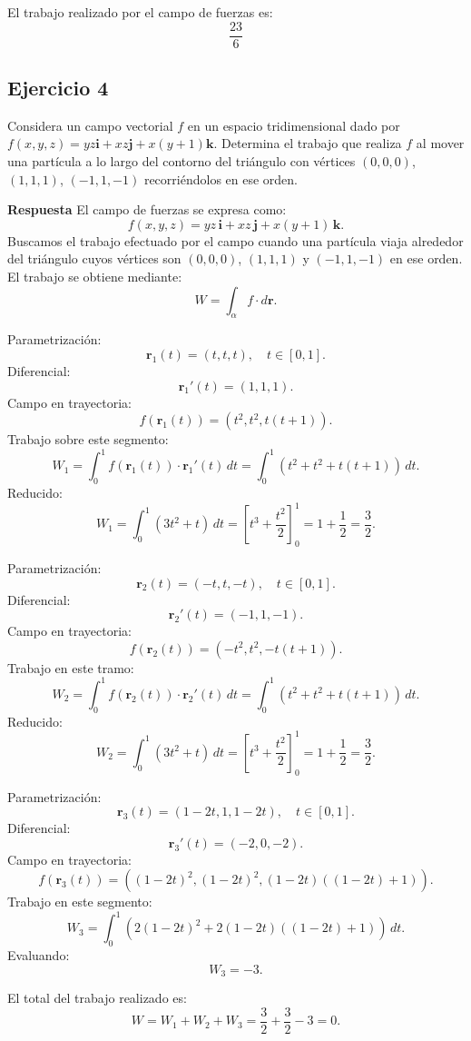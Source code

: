 \documentclass{report}
\begin{document}
El trabajo realizado por el campo de fuerzas es:
\[
\boxed{\frac{23}{6}}
\]

\newpage

\subsection*{Ejercicio 4}
Considera un campo vectorial $f$ en un espacio tridimensional dado por $f(x, y, z)=y z \mathbf{i}+x z \mathbf{j}+x(y+1) \mathbf{k}$. Determina el trabajo que realiza $f$ al mover una partícula a lo largo del contorno del triángulo con vértices $(0,0,0)$, $(1,1,1)$, $(-1,1,-1)$ recorriéndolos en ese orden.

\textbf{Respuesta}
El campo de fuerzas se expresa como:
\[
f(x, y, z) = yz \, \mathbf{i} + xz \, \mathbf{j} + x(y+1) \, \mathbf{k}.
\]
Buscamos el trabajo efectuado por el campo cuando una partícula viaja alrededor del triángulo cuyos vértices son \((0,0,0)\), \((1,1,1)\) y \((-1,1,-1)\) en ese orden. El trabajo se obtiene mediante:
\[
W = \int_{\alpha} f \cdot d\mathbf{r}.
\]


Parametrización:
\[
\mathbf{r}_1(t) = (t, t, t), \quad t \in [0, 1].
\]
Diferencial:
\[
\mathbf{r}_1'(t) = (1, 1, 1).
\]
Campo en trayectoria:
\[
f(\mathbf{r}_1(t)) = (t^2, t^2, t(t+1)).
\]
Trabajo sobre este segmento:
\[
W_1 = \int_0^1 f(\mathbf{r}_1(t)) \cdot \mathbf{r}_1'(t) \, dt = \int_0^1 (t^2 + t^2 + t(t+1)) \, dt.
\]
Reducido:
\[
W_1 = \int_0^1 (3t^2 + t) \, dt = \left[t^3 + \frac{t^2}{2}\right]_0^1 = 1 + \frac{1}{2} = \frac{3}{2}.
\]


Parametrización:
\[
\mathbf{r}_2(t) = (-t, t, -t), \quad t \in [0, 1].
\]
Diferencial:
\[
\mathbf{r}_2'(t) = (-1, 1, -1).
\]
Campo en trayectoria:
\[
f(\mathbf{r}_2(t)) = (-t^2, t^2, -t(t+1)).
\]
Trabajo en este tramo:
\[
W_2 = \int_0^1 f(\mathbf{r}_2(t)) \cdot \mathbf{r}_2'(t) \, dt = \int_0^1 (t^2 + t^2 + t(t+1)) \, dt.
\]
Reducido:
\[
W_2 = \int_0^1 (3t^2 + t) \, dt = \left[t^3 + \frac{t^2}{2}\right]_0^1 = 1 + \frac{1}{2} = \frac{3}{2}.
\]


Parametrización:
\[
\mathbf{r}_3(t) = (1-2t, 1, 1-2t), \quad t \in [0, 1].
\]
Diferencial:
\[
\mathbf{r}_3'(t) = (-2, 0, -2).
\]
Campo en trayectoria:
\[
f(\mathbf{r}_3(t)) = ((1-2t)^2, (1-2t)^2, (1-2t)((1-2t)+1)).
\]
Trabajo en este segmento:
\[
W_3 = \int_0^1 \left(2(1-2t)^2 + 2(1-2t)((1-2t)+1)\right) \, dt.
\]
Evaluando:
\[
W_3 = -3.
\]


El total del trabajo realizado es:
\[
W = W_1 + W_2 + W_3 = \frac{3}{2} + \frac{3}{2} - 3 = 0.
\]
\end{document}
